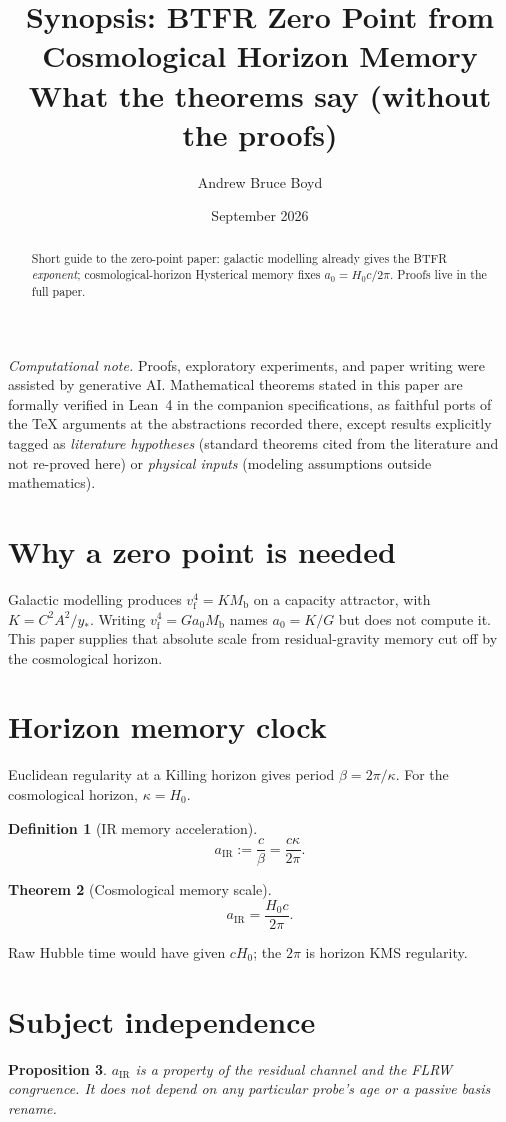 \documentclass[11pt]{article}
\title{\textbf{Synopsis: BTFR Zero Point from Cosmological Horizon Memory}\\[0.35em]
\large What the theorems say (without the proofs)}
\author{Andrew Bruce Boyd}
\date{September 2026}
\newtheorem{theorem}{Theorem}[section]
\newtheorem{proposition}[theorem]{Proposition}
\theoremstyle{definition}
\newtheorem{definition}[theorem]{Definition}
\theoremstyle{remark}
\newcommand{\Mb}{M_{\mathrm{b}}}
\newcommand{\vf}{v_{\mathrm{f}}}
\begin{document}
\maketitle
\noindent\textit{Computational note.}
Proofs, exploratory experiments, and paper writing were assisted by generative AI.
Mathematical theorems stated in this paper are formally verified in Lean~4 in the
companion specifications, as faithful ports of the TeX arguments at the abstractions
recorded there, except results explicitly tagged as \emph{literature hypotheses}
(standard theorems cited from the literature and not re-proved here) or
\emph{physical inputs} (modeling assumptions outside mathematics).

\begin{abstract}
Short guide to the zero-point paper: galactic modelling already gives the BTFR
\emph{exponent}; cosmological-horizon Hysterical memory fixes
$a_0=H_0c/2\pi$.
Proofs live in the full paper.
\end{abstract}

\section{Why a zero point is needed}
Galactic modelling produces $\vf^{4}=K\Mb$ on a capacity attractor, with
$K=C^{2}A^{2}/y_{\ast}$.
Writing $\vf^{4}=Ga_0\Mb$ names $a_0=K/G$ but does not compute it.
This paper supplies that absolute scale from residual-gravity memory cut off by the
cosmological horizon.

\section{Horizon memory clock}
Euclidean regularity at a Killing horizon gives period $\beta=2\pi/\kappa$.
For the cosmological horizon, $\kappa=H_0$.

\begin{definition}[IR memory acceleration]
\[
  a_{\mathrm{IR}}:=\frac{c}{\beta}=\frac{c\kappa}{2\pi}.
\]
\end{definition}

\begin{theorem}[Cosmological memory scale]
\[
  \boxed{a_{\mathrm{IR}}=\frac{H_0c}{2\pi}.}
\]
\end{theorem}

Raw Hubble time would have given $cH_0$; the $2\pi$ is horizon KMS regularity.

\section{Subject independence}
\begin{proposition}
$a_{\mathrm{IR}}$ is a property of the residual channel and the FLRW congruence.
It does not depend on any particular probe's age or a passive basis rename.
\end{proposition}
\end{document}
